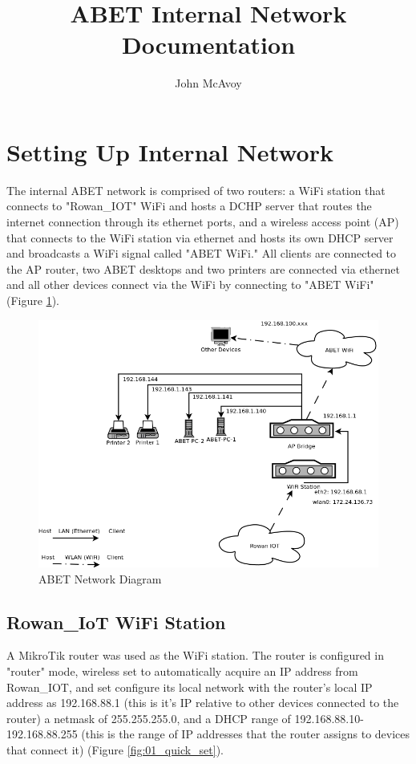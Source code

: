 \documentclass{article}
\author{John McAvoy}
\date{}
\title{ABET Internal Network Documentation}
\begin{document}
\maketitle

\tableofcontents

\section{Setting Up Internal Network}
The internal ABET network is comprised of two routers: a WiFi station that connects to "Rowan\_IOT" WiFi and hosts a DCHP server that routes the internet connection through its
ethernet ports, and a wireless access point (AP) that connects to the WiFi station via ethernet and hosts its own DHCP server and broadcasts a WiFi signal called "ABET WiFi."
All clients are connected to the AP router, two ABET desktops and two printers are connected via ethernet and all other devices connect via the WiFi by connecting to "ABET
WiFi" (Figure \ref{fig:network}).

\begin{figure}[H]
  \centering
  \includegraphics[scale=0.30]{./img/network.png}
  \caption{ABET Network Diagram}
  \label{fig:network}
\end{figure}

\subsection{Rowan\_IoT WiFi Station}
A MikroTik router was used as the WiFi station. The router is configured in
"router" mode, wireless set to automatically acquire an IP address from
Rowan\_IOT, and set configure its local network with the router's local IP address as
192.168.88.1 (this is it's IP relative to other devices connected to the router)
a netmask of 255.255.255.0, and a DHCP range of 192.168.88.10-192.168.88.255
(this is the range of IP addresses that the router assigns to devices that
connect it) (Figure \ref{fig:01_quick_set}).
\end{document}

